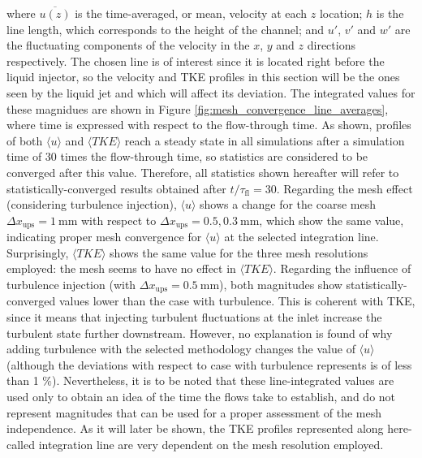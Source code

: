 where $\overline{u \left( z \right)}$ is the time-averaged, or mean, velocity at each $z$ location; $h$ is the line length, which corresponds to the height of the channel; and $u'$, $v'$ and $w'$ are the fluctuating components of the velocity in the $x$, $y$ and $z$ directions respectively. The chosen line is of interest since it is located right before the liquid injector, so the velocity and TKE profiles in this section will be the ones seen by the liquid jet and which will affect its deviation. The integrated values for these magnidues are shown in Figure \ref{fig:mesh_convergence_line_averages}, where time is expressed with respect to the flow-through time. As shown, profiles of both $\langle u \rangle$ and $\langle TKE \rangle$ reach a steady state in all simulations after a simulation time of $30$ times the flow-through time, so statistics are considered to be converged after this value. Therefore, all statistics shown hereafter will refer to statistically-converged results obtained after $t / \tau_\mathrm{fl} = 30$. Regarding the mesh effect (considering turbulence injection), $\langle u \rangle$ shows a change for the coarse mesh $\Delta x_\mathrm{ups} = 1~\mathrm{mm}$ with respect to $\Delta x_\mathrm{ups} = 0.5, 0.3~\mathrm{mm}$, which show the same value, indicating proper mesh convergence for $\langle u \rangle$ at the selected integration line. Surprisingly, $\langle TKE \rangle$ shows the same value for the three mesh resolutions employed: the mesh seems to have no effect in $\langle TKE \rangle$. Regarding the influence of turbulence injection (with $\Delta x_\mathrm{ups} = 0.5~\mathrm{mm}$), both magnitudes show statistically-converged values lower than the case with turbulence. This is coherent with TKE, since it means that injecting turbulent fluctuations at the inlet increase the turbulent state further downstream. However, no explanation is found of why adding turbulence with the selected methodology changes the value of $\langle u \rangle$ (although the deviations with respect to case with turbulence represents is of less than 1 $\%$). Nevertheless, it is to be noted that these line-integrated values are used only to obtain an idea of the time the flows take to establish, and do not represent magnitudes that can be used for a proper assessment of the mesh independence. As it will later be shown, the TKE profiles represented along here-called integration line are very dependent on the mesh resolution employed.


